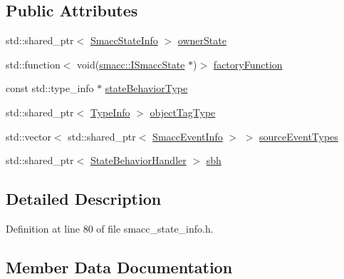 \subsection*{Public Attributes}
\begin{DoxyCompactItemize}
\item 
std\+::shared\+\_\+ptr$<$ \hyperlink{classsmacc_1_1introspection_1_1SmaccStateInfo}{Smacc\+State\+Info} $>$ \hyperlink{structsmacc_1_1introspection_1_1SmaccStateBehaviorInfo_a3a8978a085abb4e649ac4d3a13bd8257}{owner\+State}
\item 
std\+::function$<$ void(\hyperlink{classsmacc_1_1ISmaccState}{smacc\+::\+I\+Smacc\+State} $\ast$)$>$ \hyperlink{structsmacc_1_1introspection_1_1SmaccStateBehaviorInfo_a966cf5a5fe5cbe839be792b04e6c7368}{factory\+Function}
\item 
const std\+::type\+\_\+info $\ast$ \hyperlink{structsmacc_1_1introspection_1_1SmaccStateBehaviorInfo_a85dc84a01fbd0b830ed6598996c4a7c9}{state\+Behavior\+Type}
\item 
std\+::shared\+\_\+ptr$<$ \hyperlink{classsmacc_1_1introspection_1_1TypeInfo}{Type\+Info} $>$ \hyperlink{structsmacc_1_1introspection_1_1SmaccStateBehaviorInfo_ae853ad3a28609fd83aa3d395d2e4c163}{object\+Tag\+Type}
\item 
std\+::vector$<$ std\+::shared\+\_\+ptr$<$ \hyperlink{structsmacc_1_1introspection_1_1SmaccEventInfo}{Smacc\+Event\+Info} $>$ $>$ \hyperlink{structsmacc_1_1introspection_1_1SmaccStateBehaviorInfo_af4ad563a4b9ed8951ddd33732d466cf4}{source\+Event\+Types}
\item 
std\+::shared\+\_\+ptr$<$ \hyperlink{classsmacc_1_1introspection_1_1StateBehaviorHandler}{State\+Behavior\+Handler} $>$ \hyperlink{structsmacc_1_1introspection_1_1SmaccStateBehaviorInfo_a023a46dffcf0dc85c90281783a1c8dff}{sbh}
\end{DoxyCompactItemize}


\subsection{Detailed Description}


Definition at line 80 of file smacc\+\_\+state\+\_\+info.\+h.



\subsection{Member Data Documentation}
